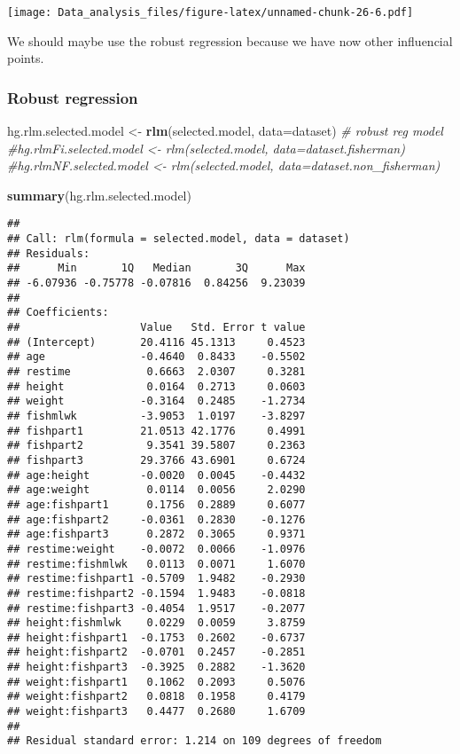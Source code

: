 \documentclass[12pt,]{article}
\newenvironment{Shaded}{\begin{snugshade}}{\end{snugshade}}
\newcommand{\KeywordTok}[1]{\textcolor[rgb]{0.13,0.29,0.53}{\textbf{#1}}}
\newcommand{\DataTypeTok}[1]{\textcolor[rgb]{0.13,0.29,0.53}{#1}}
\newcommand{\StringTok}[1]{\textcolor[rgb]{0.31,0.60,0.02}{#1}}
\newcommand{\CommentTok}[1]{\textcolor[rgb]{0.56,0.35,0.01}{\textit{#1}}}
\newcommand{\NormalTok}[1]{#1}
\begin{document}
\texttt{[image: Data\_analysis\_files/figure-latex/unnamed-chunk-26-6.pdf]}

We should maybe use the robust regression because we have now other
influencial points.

\subsubsection{Robust regression}\label{robust-regression}

\begin{Shaded}
\begin{Highlighting}[]
\NormalTok{hg.rlm.selected.model <-}\StringTok{ }\KeywordTok{rlm}\NormalTok{(selected.model, }\DataTypeTok{data=}\NormalTok{dataset)  }\CommentTok{# robust reg model}
\CommentTok{#hg.rlmFi.selected.model <- rlm(selected.model, data=dataset.fisherman)}
\CommentTok{#hg.rlmNF.selected.model <- rlm(selected.model, data=dataset.non_fisherman)}

\KeywordTok{summary}\NormalTok{(hg.rlm.selected.model)}
\end{Highlighting}
\end{Shaded}

\begin{verbatim}
## 
## Call: rlm(formula = selected.model, data = dataset)
## Residuals:
##      Min       1Q   Median       3Q      Max 
## -6.07936 -0.75778 -0.07816  0.84256  9.23039 
## 
## Coefficients:
##                   Value   Std. Error t value
## (Intercept)       20.4116 45.1313     0.4523
## age               -0.4640  0.8433    -0.5502
## restime            0.6663  2.0307     0.3281
## height             0.0164  0.2713     0.0603
## weight            -0.3164  0.2485    -1.2734
## fishmlwk          -3.9053  1.0197    -3.8297
## fishpart1         21.0513 42.1776     0.4991
## fishpart2          9.3541 39.5807     0.2363
## fishpart3         29.3766 43.6901     0.6724
## age:height        -0.0020  0.0045    -0.4432
## age:weight         0.0114  0.0056     2.0290
## age:fishpart1      0.1756  0.2889     0.6077
## age:fishpart2     -0.0361  0.2830    -0.1276
## age:fishpart3      0.2872  0.3065     0.9371
## restime:weight    -0.0072  0.0066    -1.0976
## restime:fishmlwk   0.0113  0.0071     1.6070
## restime:fishpart1 -0.5709  1.9482    -0.2930
## restime:fishpart2 -0.1594  1.9483    -0.0818
## restime:fishpart3 -0.4054  1.9517    -0.2077
## height:fishmlwk    0.0229  0.0059     3.8759
## height:fishpart1  -0.1753  0.2602    -0.6737
## height:fishpart2  -0.0701  0.2457    -0.2851
## height:fishpart3  -0.3925  0.2882    -1.3620
## weight:fishpart1   0.1062  0.2093     0.5076
## weight:fishpart2   0.0818  0.1958     0.4179
## weight:fishpart3   0.4477  0.2680     1.6709
## 
## Residual standard error: 1.214 on 109 degrees of freedom
\end{verbatim}
\end{document}
